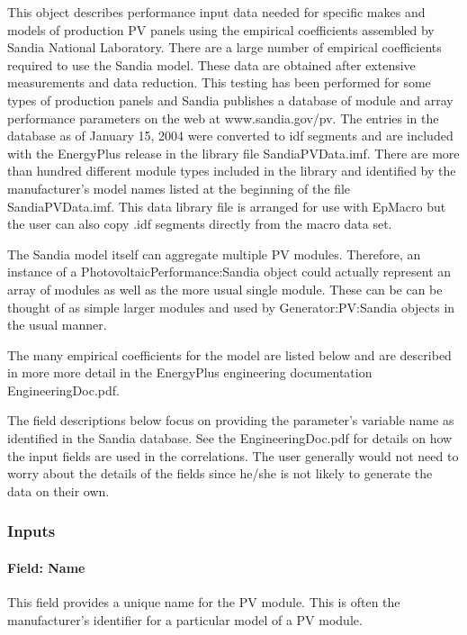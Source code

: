 This object describes performance input data needed for specific makes and models of production PV panels using the empirical coefficients assembled by Sandia National Laboratory. There are a large number of empirical coefficients required to use the Sandia model. These data are obtained after extensive measurements and data reduction. This testing has been performed for some types of production panels and Sandia publishes a database of module and array performance parameters on the web at www.sandia.gov/pv. The entries in the database as of January 15, 2004 were converted to idf segments and are included with the EnergyPlus release in the library file SandiaPVData.imf. There are more than hundred different module types included in the library and identified by the manufacturer's model names listed at the beginning of the file SandiaPVData.imf. This data library file is arranged for use with EpMacro but the user can also copy .idf segments directly from the macro data set.

The Sandia model itself can aggregate multiple PV modules. Therefore, an instance of a PhotovoltaicPerformance:Sandia object could actually represent an array of modules as well as the more usual single module. These can be can be thought of as simple larger modules and used by Generator:PV:Sandia objects in the usual manner.

The many empirical coefficients for the model are listed below and are described in more more detail in the EnergyPlus engineering documentation EngineeringDoc.pdf.

The field descriptions below focus on providing the parameter's variable name as identified in the Sandia database. See the EngineeringDoc.pdf for details on how the input fields are used in the correlations. The user generally would not need to worry about the details of the fields since he/she is not likely to generate the data on their own.

\subsubsection{Inputs}\label{inputs-22}

\paragraph{Field: Name}\label{field-name-26}

This field provides a unique name for the PV module. This is often the manufacturer's identifier for a particular model of a PV module.

